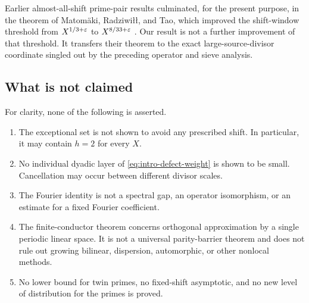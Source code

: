 Earlier almost-all-shift prime-pair results culminated, for the present
purpose, in the theorem of Matom\"aki, Radziwi\l\l, and Tao, which improved
the shift-window threshold from $X^{1/3+\varepsilon}$ to
$X^{8/33+\varepsilon}$ \citep{Mikawa1991,MatomakiRadziwillTao2019}.  Our result is
not a further improvement of that threshold.  It transfers their theorem to
the exact large-source-divisor coordinate singled out by the preceding
operator and sieve analysis.

\subsection{What is not claimed}
\label{subsec:intro-not-claimed}

For clarity, none of the following is asserted.
\begin{enumerate}[label=\textbf{B\arabic*.},leftmargin=3.2em]
 \item The exceptional set is not shown to avoid any prescribed shift.
 In particular, it may contain $h=2$ for every $X$.
 \item No individual dyadic layer of \eqref{eq:intro-defect-weight} is shown
 to be small.  Cancellation may occur between different divisor scales.
 \item The Fourier identity is not a spectral gap, an operator
 isomorphism, or an estimate for a fixed Fourier coefficient.
 \item The finite-conductor theorem concerns orthogonal approximation by a
 single periodic linear space.  It is not a universal parity-barrier theorem
 and does not rule out growing bilinear, dispersion, automorphic, or other
 nonlocal methods.
 \item No lower bound for twin primes, no fixed-shift asymptotic, and no new
 level of distribution for the primes is proved.
\end{enumerate}
